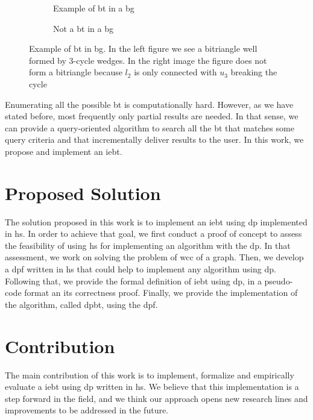 \begin{figure}[htp!]
\begin{subfigure}[b]{0.5\textwidth}
\centering
{}
\caption{Example of \acrshort{bt} in a \acrshort{bg}}
\label{fig:bitriangle-example}
\end{subfigure}
\begin{subfigure}[b]{0.5\textwidth}
\centering
{}
\caption{Not a \acrshort{bt} in a \acrshort{bg}}
\label{fig:bitriangle-not}
\end{subfigure}
\caption[{[Int] Example of \acrshort{bt} in a \acrshort{bg}}]{Example of \acrshort{bt} in \acrshort{bg}. In the left figure  we see a bitriangle well formed by 3-cycle wedges. In the right image the figure does not form a bitriangle because $l_2$ is only connected with $u_3$ breaking the cycle}
\end{figure}

Enumerating all the possible \acrshort{bt} is computationally hard. However, as we have stated before, most frequently only partial results are needed. In that sense, we can provide a query-oriented  algorithm to search all  the \acrshort{bt} that matches some query criteria and  that incrementally deliver results to the user. In this work, we propose and implement an \acrlong{iebt}.

\section{Proposed Solution}
The solution proposed in this work is to implement an \acrlong{iebt} using \acrlong{dp} implemented in \acrfull{hs}.
In order to achieve that goal, we first conduct a proof of concept to assess the feasibility of using \acrshort{hs} for implementing an algorithm with the \acrshort{dp}. In that assessment, we work on solving the problem of \acrfull{wcc} of a graph. Then, we develop a \acrfull{dpf} written in \acrlong{hs} that could help to implement any algorithm using \acrshort{dp}.
Following that, we provide the formal definition of \acrshort{iebt} using \acrshort{dp}, in a pseudo-code format an its correctness proof.   Finally, we provide the implementation of the algorithm, called \acrfull{dpbt}, using the \acrshort{dpf}. 

\section{Contribution}\label{sec:contrib}
The main contribution of this work is to implement, formalize and empirically evaluate a \acrlong{iebt} using \acrlong{dp} written in \acrshort{hs}.
We believe that this implementation is a step forward in the field, and we think our approach opens new research lines and improvements to be addressed in the future. 

